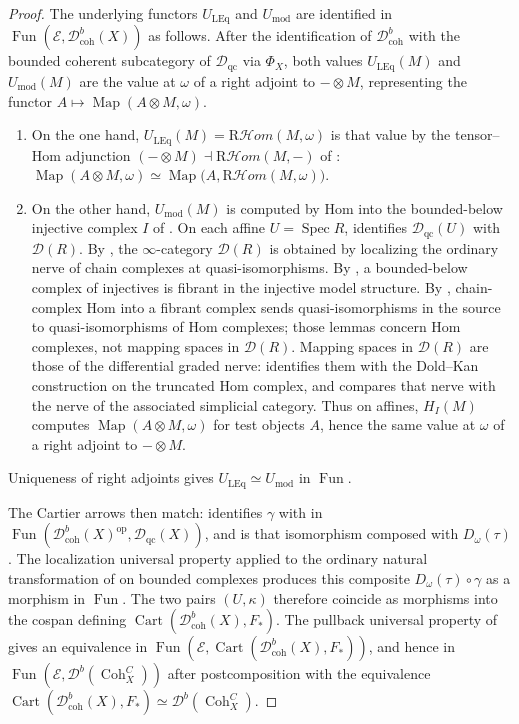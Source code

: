 \documentclass[11pt]{amsart}
\newcommand{\cD}{\mathcal{D}}
\newcommand{\Cart}{\operatorname{Cart}}
\newcommand{\Map}{\operatorname{Map}}
\newcommand{\op}{{\operatorname{op}}}
\newcommand{\Coh}{\operatorname{{Coh}}}
\newcommand{\Spec}{\operatorname{Spec}}
\DeclareMathOperator{\Fun}{\mathrm{Fun}}
\newcommand{\RHom}{\mathrm R\mathcal Hom}
\newcommand{\Dqc}{\mathcal D_{\mathrm{qc}}}
\newcommand{\Dbc}{\mathcal D^b_{\mathrm{coh}}}
\newcommand{\Db}{\mathcal D^b}
\theoremstyle{plain}
\theoremstyle{definition}
\numberwithin{equation}{section}
\begin{document}
\begin{proof}
The underlying functors $U_{\mathrm{LEq}}$ and $U_{\mathrm{mod}}$ are identified in $\Fun(\mathcal E,\Dbc(X))$ as follows.
After the identification of $\Dbc$ with the bounded coherent subcategory of $\Dqc$ via $\Phi_X$, both values $U_{\mathrm{LEq}}(M)$ and $U_{\mathrm{mod}}(M)$ are the value at $\omega$ of a right adjoint to $-\otimes M$, representing the functor $A\mapsto\Map(A\otimes M,\omega)$.
\begin{enumerate}
\item
On the one hand, $U_{\mathrm{LEq}}(M)=\RHom(M,\omega)$ is that value by the tensor--Hom adjunction $(-\otimes M)\dashv\RHom(M,-)$ of : $\Map(A\otimes M,\omega)\simeq\Map\bigl(A,\RHom(M,\omega)\bigr)$.
\item
On the other hand, $U_{\mathrm{mod}}(M)$ is computed by Hom into the bounded-below injective complex $I$ of .
On each affine $U=\Spec R$,  identifies $\Dqc(U)$ with $\cD(R)$.
By \cite[Proposition 1.3.5.15]{HA}, the $\infty$-category $\cD(R)$ is obtained by localizing the ordinary nerve of chain complexes at quasi-isomorphisms.
By \cite[Proposition 1.3.5.6]{HA}, a bounded-below complex of injectives is fibrant in the injective model structure.
By \cite[Lemma 1.3.5.11; Proposition 1.3.5.14]{HA}, chain-complex Hom into a fibrant complex sends quasi-isomorphisms in the source to quasi-isomorphisms of Hom complexes; those lemmas concern Hom complexes, not mapping spaces in $\cD(R)$.
Mapping spaces in $\cD(R)$ are those of the differential graded nerve: \cite[Remark 1.3.1.12]{HA} identifies them with the Dold--Kan construction on the truncated Hom complex, and \cite[Proposition 1.3.1.17]{HA} compares that nerve with the nerve of the associated simplicial category.
Thus on affines, $H_I(M)$ computes $\Map(A\otimes M,\omega)$ for test objects $A$, hence the same value at $\omega$ of a right adjoint to $-\otimes M$.
\end{enumerate}
Uniqueness of right adjoints \cite[Remark 5.2.2.2]{HTT} gives $U_{\mathrm{LEq}}\simeq U_{\mathrm{mod}}$ in $\Fun$.

The Cartier arrows then match:  identifies $\gamma$ with \cite[Lemma 3.4.1, first item and (3.4.1.c)]{Bau} in $\Fun(\Dbc(X)^{\op},\Dqc(X))$, and \cite[Construction 4.1.1]{Bau} is that isomorphism composed with $D_\omega(\tau)$.
The localization universal property \cite[\href{https://kerodon.net/tag/01MP}{Tag 01MP}]{Kerodon} applied to the ordinary natural transformation of \cite[Construction 4.1.1]{Bau} on bounded complexes produces this composite $D_\omega(\tau)\circ\gamma$ as a morphism in $\Fun$.
The two pairs $(U,\kappa)$ therefore coincide as morphisms into the cospan defining $\Cart(\Dbc(X),F_*)$.
The pullback universal property of  gives an equivalence in $\Fun(\mathcal E,\Cart(\Dbc(X),F_*))$, and hence in $\Fun(\mathcal E,\Db(\Coh^C_X))$ after postcomposition with the equivalence $\Cart(\Dbc(X),F_*)\simeq\Db(\Coh^C_X)$.
\end{proof}
\end{document}
